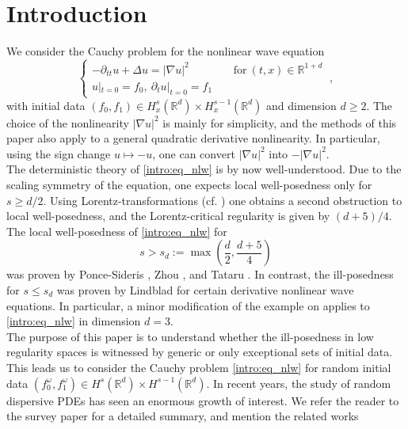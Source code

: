 \documentclass[11pt]{article}
\begin{document}
\section{Introduction}
We consider the Cauchy problem for the nonlinear wave equation 
\begin{equation}\label{intro:eq_nlw}
\begin{cases}
-\partial_{tt} u + \Delta u = |\nabla u|^2  \qquad\qquad \text{for} ~ (t,x)\in \mathbb{R}^{1+d} \\
u|_{t=0}=f_0 , ~ \partial_t u|_{t=0}=f_1 
\end{cases}~,
\end{equation}
with initial data \( (f_0,f_1)\in H_x^{s}(\mathbb{R}^d)\times H_x^{s-1}(\mathbb{R}^d)\) and dimension \( d \geq 2 \). The choice of the nonlinearity \( |\nabla u|^2 \) is mainly for simplicity, and the methods of this paper also apply to a general quadratic derivative nonlinearity. In particular, using the sign change \( u \mapsto -u \), one can convert \( |\nabla u|^2 \) into \( -|\nabla u|^2 \).\\
 The deterministic theory of \eqref{intro:eq_nlw} is by now well-understood. 
Due to the scaling symmetry of the equation, one expects local well-posedness only for \( s \geq d/2\). Using Lorentz-transformations (cf. \cite{SS98,Tao06}) one obtains a second obstruction to local well-posedness, and the Lorentz-critical regularity is given by \( (d+5)/4 \). The local well-posedness of \eqref{intro:eq_nlw} for 
\begin{equation*}
s> s_d:=\max \left( \frac{d}{2}, \frac{d+5}{4} \right)
\end{equation*}
was proven by Ponce-Sideris \cite{PS93}, Zhou \cite{Zhou03}, and Tataru \cite{Tataru99}. In contrast, the ill-posedness for \( s \leq s_d \) was proven by Lindblad \cite{Lindblad93, Lindblad96} for certain derivative nonlinear wave equations. In particular, a minor modification of the example on \cite[p. 511]{Lindblad93} applies to \eqref{intro:eq_nlw} in dimension \( d=3 \).\\
The purpose of this paper is to understand whether the ill-posedness in low regularity spaces is witnessed by generic or only exceptional sets of initial data. This leads us to consider the Cauchy problem \eqref{intro:eq_nlw} for random initial data \( (f_0^\omega, f_1^\omega) \in H^s(\mathbb{R}^d)\times H^{s-1}(\mathbb{R}^d) \). In recent years, the study of random dispersive PDEs has seen an enormous growth of interest. We refer the reader to the survey paper \cite{BOP18} for a detailed summary, and mention the related works
\end{document}
